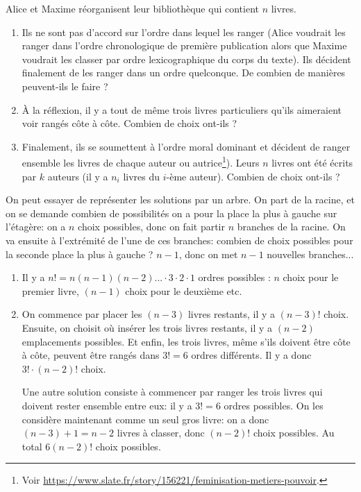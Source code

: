 \begin{exo}
Alice et Maxime réorganisent leur bibliothèque qui contient $n$ livres.
\begin{enumerate}
\item Ils ne sont pas d'accord sur l'ordre dans lequel les ranger (Alice voudrait les ranger dans l'ordre chronologique de première publication alors que Maxime voudrait les classer par ordre lexicographique du corps du texte). Ils décident finalement de les ranger dans un ordre quelconque. De combien de manières peuvent-ils le faire ?
\item À la réflexion, il y a tout de même trois livres particuliers qu'ils aimeraient voir rangés côte à côte. Combien de choix ont-ils ?
\item Finalement, ils se soumettent à l'ordre moral dominant et décident de ranger ensemble les livres de chaque auteur ou autrice\footnote{Voir \url{https://www.slate.fr/story/156221/feminisation-metiers-pouvoir}.}). Leurs $n$ livres ont été écrits par $k$ auteurs (il y a $n_i$ livres du $i$-ème auteur). Combien de choix ont-ils ?
\end{enumerate}

\begin{hint} %
On peut essayer de représenter les solutions par un arbre.  On part de la racine, et on se demande combien de possibilités on a pour la place la plus à gauche sur l'étagère: on a $n$ choix possibles, donc on fait partir $n$ branches de la racine. On va ensuite à l'extrémité de l'une de ces branches: combien de choix possibles pour la seconde place la plus à gauche ? $n-1$, donc on met $n-1$ nouvelles branches...
\end{hint}

\begin{sol} %
\begin{enumerate}
\item Il y a $n!=n(n-1)(n-2)...\cdot 3\cdot 2\cdot 1$ ordres possibles : $n$ choix pour le premier livre, $(n-1)$ choix pour le deuxième etc.
\item On commence par placer les $(n-3)$ livres restants, il y a $(n-3)!$ choix. Ensuite, on choisit où insérer les trois livres restants, il y a $(n-2)$ emplacements possibles. Et enfin, les trois livres, même s'ils doivent être côte à côte, peuvent être rangés dans $3!=6$ ordres différents. Il y a donc $3!\cdot (n-2)!$ choix.

Une autre solution consiste à commencer par ranger les trois livres qui doivent rester ensemble entre eux: il y a $3!=6$ ordres possibles. On les considère maintenant comme un seul gros livre: on a donc $(n-3)+1=n-2$ livres à classer, donc $(n-2)!$ choix possibles. Au total $6(n-2)!$ choix possibles. 


\end{enumerate}
\end{sol}
\end{exo}
